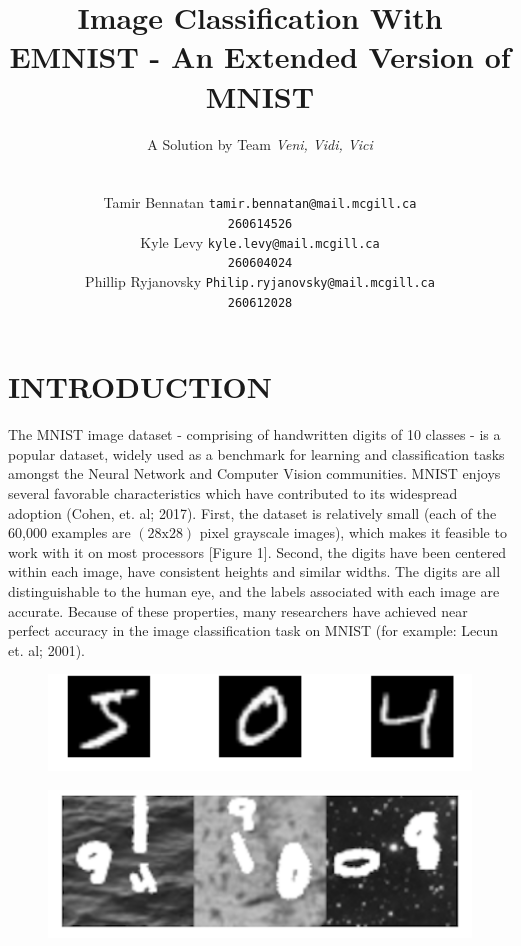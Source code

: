 \documentclass[letterpaper, 10 pt, conference]{ieeeconf}  %
\title{\LARGE \bf
Image Classification With EMNIST - An Extended Version of MNIST
}
\author{ \large A Solution by Team \emph{Veni, Vidi, Vici}\\ \\
	\parbox{2 in}{\centering Tamir Bennatan
         {\tt\small tamir.bennatan@mail.mcgill.ca\\}
         {\tt\small 260614526}}
         \hspace*{ 0.3 in}
         \parbox{2 in}{\centering Kyle Levy
         {\tt\small kyle.levy@mail.mcgill.ca\\}
         {\tt\small 260604024}}
         \hspace*{0.3 in}
         \parbox{2 in}{\centering Phillip Ryjanovsky
         {\tt\small Philip.ryjanovsky@mail.mcgill.ca\\}
         {\tt\small 260612028}}
}
\begin{document}
\maketitle
\thispagestyle{empty}
\pagestyle{empty}




\section{INTRODUCTION}

The MNIST image dataset - comprising of handwritten digits of 10 classes - is a popular dataset, widely used as a  benchmark for learning and classification tasks amongst the Neural Network and Computer Vision communities. MNIST enjoys several favorable characteristics which have contributed to its widespread adoption (Cohen, et. al; 2017). First, the dataset is relatively small (each of the 60,000 examples are $(28\text{x}28)$ pixel grayscale images), which makes it feasible to work with it on most processors [Figure 1]. Second, the digits have been centered within each image, have consistent heights and similar widths. The digits are all distinguishable to the human eye, and the labels associated with each image are accurate. Because of these properties, many researchers have achieved near perfect accuracy in the image classification task on MNIST (for example: Lecun et. al; 2001).

\begin{figure}[ht]
\centering
\begin{minipage}{.5\textwidth}
  \centering
  \includegraphics[width=1\linewidth]{mnist_sample}
  \label{fig:test1}
\end{minipage}%
\begin{minipage}{.5\textwidth}
  \centering
  \includegraphics[width=1\linewidth]{emnist_sample}
  \label{fig:test2}
\end{minipage}
\end{figure}
\end{document}
